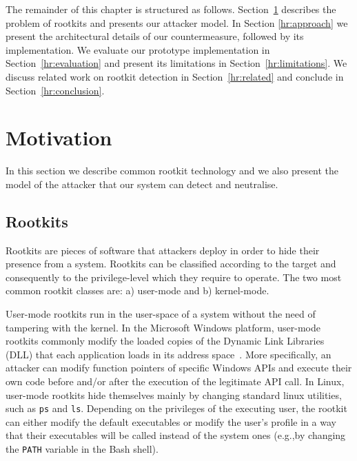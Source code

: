 
The remainder of this chapter is structured as follows. Section~\ref{hr:motivation} describes the problem of rootkits and presents our attacker model. In Section \ref{hr:approach} we present the architectural details of our countermeasure, followed by its implementation.
We evaluate our prototype implementation in Section~\ref{hr:evaluation} and present its limitations in Section~\ref{hr:limitations}. We discuss related work on rootkit detection in Section~\ref{hr:related} and conclude in Section~\ref{hr:conclusion}.

\section{Motivation}\label{hr:motivation}
In this section we describe common rootkit technology and we also present the model of the attacker that our system can detect and neutralise.

\subsection{Rootkits}
Rootkits are pieces of software that attackers deploy in order to hide their presence from a system. Rootkits can be classified according to the target and consequently to the privilege-level which they require to operate. The two most common rootkit classes are: a) user-mode and b) kernel-mode.

User-mode rootkits run in the user-space of a system without the need of tampering with the kernel. In the Microsoft Windows platform, user-mode rootkits commonly modify the loaded copies of the Dynamic Link Libraries (DLL) that each application loads in its address space~\cite{SymantecRootkits}. 
More specifically, an attacker can modify function pointers of specific Windows APIs and execute their own code before and/or after the execution of the legitimate API call. In Linux, user-mode rootkits hide themselves mainly by changing standard linux utilities, such as \texttt{ps} and \texttt{ls}. Depending on the privileges of the executing user, the rootkit can either modify the default executables or modify the user's profile in a way that their executables will be called instead of the system ones (e.g.,by changing the \texttt{PATH} variable in the Bash shell).

